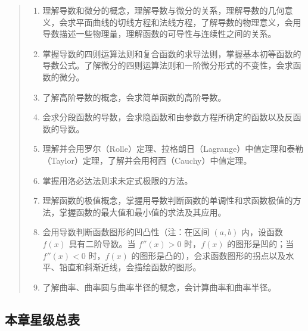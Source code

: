 \documentclass[11pt,openany,UTF8]{ctexbook}
\begin{document}
\begin{quote}
\begin{enumerate}
\item 理解导数和微分的概念，理解导数与微分的关系，理解导数的几何意义，会求平面曲线的切线方程和法线方程，了解导数的物理意义，会用导数描述一些物理量，理解函数的可导性与连续性之间的关系。
\item 掌握导数的四则运算法则和复合函数的求导法则，掌握基本初等函数的导数公式。了解微分的四则运算法则和一阶微分形式的不变性，会求函数的微分。
\item 了解高阶导数的概念，会求简单函数的高阶导数。
\item 会求分段函数的导数，会求隐函数和由参数方程所确定的函数以及反函数的导数。
\item 理解并会用罗尔（Rolle）定理、拉格朗日（Lagrange）中值定理和泰勒（Taylor）定理，了解并会用柯西（Cauchy）中值定理。
\item 掌握用洛必达法则求未定式极限的方法。
\item 理解函数的极值概念，掌握用导数判断函数的单调性和求函数极值的方法，掌握函数的最大值和最小值的求法及其应用。
\item 会用导数判断函数图形的凹凸性（注：在区间 $(a,b)$ 内，设函数 $f(x)$ 具有二阶导数。当 $f''(x)>0$ 时，$f(x)$ 的图形是凹的；当 $f''(x)<0$ 时，$f(x)$ 的图形是凸的），会求函数图形的拐点以及水平、铅直和斜渐近线，会描绘函数的图形。
\item 了解曲率、曲率圆与曲率半径的概念，会计算曲率和曲率半径。
\end{enumerate}
\end{quote}
\subsection*{本章星级总表}
\end{document}
